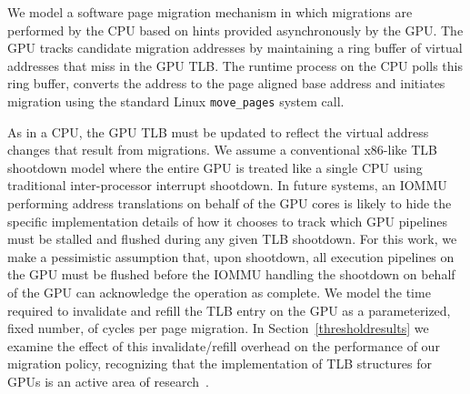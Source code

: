 
We model a software page migration mechanism in which migrations are performed
by the CPU based on hints provided asynchronously by the GPU\@.  The GPU tracks
candidate migration addresses by maintaining a ring buffer of virtual addresses
that miss in the GPU TLB.  The runtime process on the CPU polls this ring
buffer, converts the address to the page aligned base address and initiates
migration using the standard Linux {\tt move\_pages} system call.

As in a CPU, the GPU TLB must be updated to reflect the virtual address changes
that result from migrations.  We assume a conventional x86-like TLB shootdown
model where the entire GPU is treated like a single CPU using traditional
inter-processor interrupt shootdown.  In future systems, an IOMMU performing
address translations on behalf of the GPU cores is likely to hide the specific
implementation details of how it chooses to track which GPU pipelines must be
stalled and flushed during any given TLB shootdown.  For this work, we make a
pessimistic assumption that, upon shootdown, all execution pipelines on the GPU
must be flushed before the IOMMU handling the shootdown on behalf of the GPU can
acknowledge the operation as complete. We model the time required to invalidate
and refill the TLB entry on the GPU as a parameterized, fixed number, of cycles
per page migration. In Section~\ref{thresholdresults} we examine the effect of
this invalidate/refill overhead on the performance of our migration policy,
recognizing that the implementation of TLB structures for GPUs is an active area
of research~\cite{Pichai2014,Power2014}.


